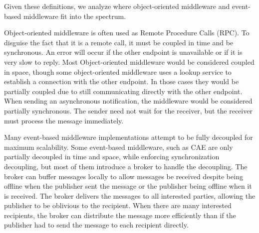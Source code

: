 \documentclass{acm_proc_article-sp}
\begin{document}
Given these definitions, we analyze where object-oriented middleware and event-based middleware fit into the spectrum.

Object-oriented middleware is often used as Remote Procedure Calls (RPC). To disguise the fact that it is a remote call, it must be coupled in time and be synchronous. An error will occur if the other endpoint is unavailable or if it is very slow to reply. Most Object-oriented middleware would be considered coupled in space, though some object-oriented middleware uses a lookup service to establish a connection with the other endpoint. In those cases they would be partially coupled due to still communicating directly with the other endpoint. When sending an asynchronous notification, the middleware would be considered partially synchronous. The sender need not wait for the receiver, but the receiver must process the message immediately.

Many event-based middleware implementations attempt to be fully decoupled for maximum scalability. Some event-based middleware, such as CAE are only partially decoupled in time and space, while enforcing synchronization decoupling, but most of them introduce a broker to handle the decoupling. The broker can buffer messages locally to allow messages be received despite being offline when the publisher sent the message or the publisher being offline when it is received. The broker delivers the messages to all interested parties, allowing the publisher to be oblivious to the recipient. When there are many interested recipients, the broker can distribute the message more efficiently than if the publisher had to send the message to each recipient directly. 


\end{document}

